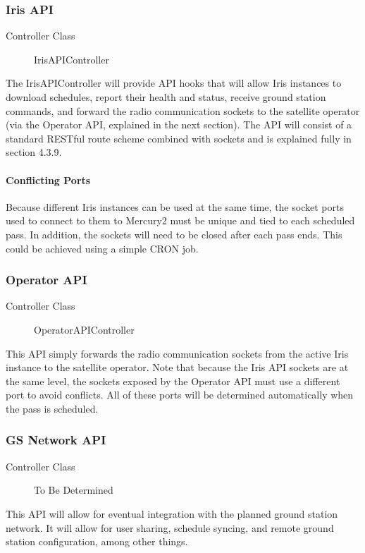 \documentclass{mxl-note}
\begin{document}
\subsubsection{Iris API}
\begin{description}
	\item [Controller Class]IrisAPIController
\end{description}
The IrisAPIController will provide API hooks that will allow Iris instances to download schedules, report their health and status, receive ground station commands, and forward the radio communication sockets to the satellite operator (via the Operator API, explained in the next section). The API will consist of a standard RESTful route scheme combined with sockets and is explained fully in section 4.3.9.

\paragraph{Conflicting Ports}
Because different Iris instances can be used at the same time, the socket ports used to connect to them to Mercury2 must be unique and tied to each scheduled pass. In addition, the sockets will need to be closed after each pass ends. This could be achieved using a simple CRON job.

\subsubsection{Operator API}
\begin{description}
	\item [Controller Class]OperatorAPIController
\end{description}
This API simply forwards the radio communication sockets from the active Iris instance to the satellite operator. Note that because the Iris API sockets are at the same level, the sockets exposed by the Operator API must use a different port to avoid conflicts. All of these ports will be determined automatically when the pass is scheduled.

\subsubsection{GS Network API}
\begin{description}
	\item [Controller Class]To Be Determined
\end{description}
This API will allow for eventual integration with the planned ground station network. It will allow for user sharing, schedule syncing, and remote ground station configuration, among other things.
\end{document}

